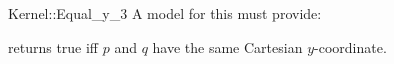 \begin{ccRefFunctionObjectConcept}{Kernel::Equal_y_3}
A model for this must provide:


{returns true iff $p$ and $q$ have the same Cartesian $y$-coordinate.}

\end{ccRefFunctionObjectConcept}
